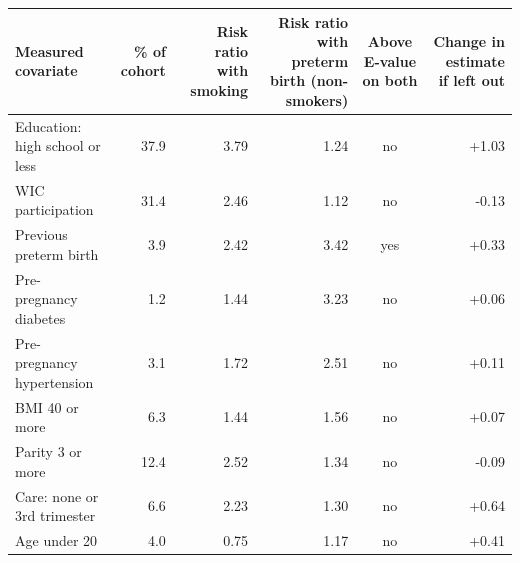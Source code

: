 {\small
\begin{tabular}{lrrrcr}
\toprule
Measured covariate & \% of cohort & Risk ratio with smoking & Risk ratio with preterm birth (non-smokers) & Above E-value on both & Change in estimate if left out \\
\midrule
Education: high school or less & 37.9 & 3.79 & 1.24 & no & +1.03 \\
WIC participation & 31.4 & 2.46 & 1.12 & no & -0.13 \\
Previous preterm birth & 3.9 & 2.42 & 3.42 & yes & +0.33 \\
Pre-pregnancy diabetes & 1.2 & 1.44 & 3.23 & no & +0.06 \\
Pre-pregnancy hypertension & 3.1 & 1.72 & 2.51 & no & +0.11 \\
BMI 40 or more & 6.3 & 1.44 & 1.56 & no & +0.07 \\
Parity 3 or more & 12.4 & 2.52 & 1.34 & no & -0.09 \\
Care: none or 3rd trimester & 6.6 & 2.23 & 1.30 & no & +0.64 \\
Age under 20 & 4.0 & 0.75 & 1.17 & no & +0.41 \\
\bottomrule
\end{tabular}
}
